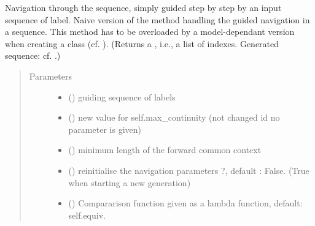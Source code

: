 \documentclass[letterpaper,10pt,english]{sphinxmanual}
\begin{document}
\begin{fulllineitems}
\begin{fulllineitems}
\label{\detokenize{index:Navigator.Navigator.simply_guided_navigation}}
Navigation through the sequence, simply guided step by step by an input sequence of label.
Naive version of the method handling the guided navigation in a sequence. 
This method has to be overloaded by a model-dependant version when creating a  class (cf. ).
(Returns a , i.e., a list of indexes. Generated sequence: cf. {\hyperref[\detokenize{index:Navigator.Navigator.simply_guided_generation}]{}}.)
\begin{quote}\begin{description}
\item[{Parameters}] \leavevmode\begin{itemize}
\item {} 
 () \textendash{} guiding sequence of labels

\item {} 
 () \textendash{} new value for self.max\_continuity (not changed id no parameter is given)

\item {} 
 () \textendash{} minimum length of the forward common context

\item {} 
 () \textendash{} reinitialise the navigation parameters ?, default : False. (True when starting a new generation)

\item {} 
 () \textendash{} Compararison function given as a lambda function, default: self.equiv.


\end{itemize}
\end{description}
\end{quote}
\end{fulllineitems}
\end{fulllineitems}
\end{document}
